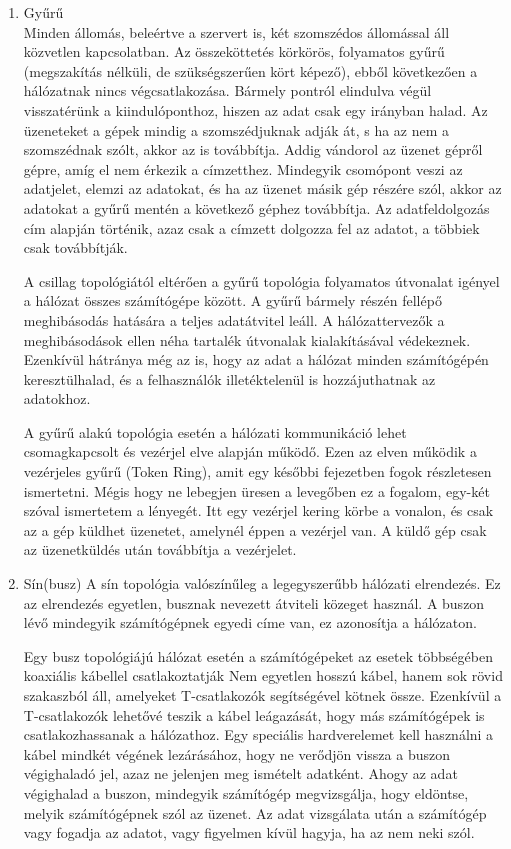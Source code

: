 \documentclass[12pt, a4paper]{article}
\begin{document}
\begin{enumerate}
\item
Gyűrű\\
Minden állomás, beleértve a szervert is, két szomszédos állomással áll közvetlen kapcsolatban. Az összeköttetés körkörös, folyamatos gyűrű (megszakítás nélküli, de szükségszerűen kört képező), ebből következően a hálózatnak nincs végcsatlakozása. Bármely pontról elindulva végül visszatérünk a kiindulóponthoz, hiszen az adat csak egy irányban halad. 
Az üzeneteket a gépek mindig a szomszédjuknak adják át, s ha az nem a szomszédnak szólt, akkor az is továbbítja. Addig vándorol az üzenet gépről gépre, amíg el nem érkezik a címzetthez. Mindegyik csomópont veszi az adatjelet, elemzi az adatokat, és ha az üzenet másik gép részére szól, akkor az adatokat a gyűrű mentén a következő géphez továbbítja. Az adatfeldolgozás cím alapján történik, azaz csak a címzett dolgozza fel az adatot, a többiek csak továbbítják.

A csillag topológiától eltérően a gyűrű topológia folyamatos útvonalat igényel a hálózat összes számítógépe között. A gyűrű bármely részén fellépő meghibásodás hatására a teljes adatátvitel leáll. A hálózattervezők a meghibásodások ellen néha tartalék útvonalak kialakításával védekeznek. Ezenkívül hátránya még az is, hogy az adat a hálózat minden számítógépén keresztülhalad, és a felhasználók illetéktelenül is hozzájuthatnak az adatokhoz.

A gyűrű alakú topológia esetén a hálózati kommunikáció lehet csomagkapcsolt és vezérjel elve alapján működő. Ezen az elven működik a vezérjeles gyűrű (Token Ring), amit egy későbbi fejezetben fogok részletesen ismertetni. Mégis hogy ne lebegjen üresen a levegőben ez a fogalom, egy-két szóval ismertetem a lényegét. Itt egy vezérjel kering körbe a vonalon, és csak az a gép küldhet üzenetet, amelynél éppen a vezérjel van. A küldő gép csak az üzenetküldés után továbbítja a vezérjelet.
\item
Sín(busz)
A sín topológia valószínűleg a legegyszerűbb hálózati elrendezés. Ez az elrendezés egyetlen, busznak nevezett átviteli közeget használ. A buszon lévő mindegyik számítógépnek egyedi címe van, ez azonosítja a hálózaton.

Egy busz topológiájú hálózat esetén a számítógépeket az esetek többségében koaxiális kábellel csatlakoztatják Nem egyetlen hosszú kábel, hanem sok rövid szakaszból áll, amelyeket T-csatlakozók segítségével kötnek össze. Ezenkívül a T-csatlakozók lehetővé teszik a kábel leágazását, hogy más számítógépek is csatlakozhassanak a hálózathoz. Egy speciális hardverelemet kell használni a kábel mindkét végének lezárásához, hogy ne verődjön vissza a buszon végighaladó jel, azaz ne jelenjen meg ismételt adatként. Ahogy az adat végighalad a buszon, mindegyik számítógép megvizsgálja, hogy eldöntse, melyik számítógépnek szól az üzenet. Az adat vizsgálata után a számítógép vagy fogadja az adatot, vagy figyelmen kívül hagyja, ha az nem neki szól.


\end{enumerate}
\end{document}
